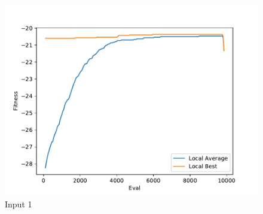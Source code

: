 \documentclass{standalone}
\begin{document}
\begin{figure}[!htb]
	\caption{Input 1}
	\label{fig:graph_1063}
	\includegraphics[width=\textwidth]{../graphs/graphs/1063.pdf}
\end{figure}
\end{document}
